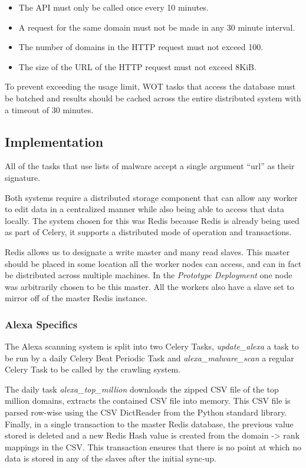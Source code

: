 \begin{itemize}
    \item The API must only be called once every 10 minutes.
    \item A request for the same domain must not be made in any 30 minute interval.
    \item The number of domains in the HTTP request must not exceed 100.
    \item The size of the URL of the HTTP request must not exceed 8KiB.
\end{itemize}

To prevent exceeding the usage limit, WOT tasks that access the database must be batched and results should be cached across the entire distributed system with a timeout of 30 minutes.


\subsection{Implementation}
All of the tasks that use lists of malware accept a single argument ``url'' as their signature.

Both systems require a distributed storage component that can allow any worker to edit data in a centralized manner while also being able to access that data locally. The system chosen for this was Redis\cite{redis} because Redis is already being used as part of Celery, it supports a distributed mode of operation and transactions.

Redis allows us to designate a write master and many read slaves. This master should be placed in some location all the worker nodes can access, and can in fact be distributed across multiple machines.  In the \emph{Prototype Deployment} one node was arbitrarily chosen to be this master. All the workers also have a slave set to mirror off of the master Redis instance.

\subsubsection{Alexa Specifics}
The Alexa scanning system is split into two Celery Tasks, \emph{update\_alexa} a task to be run by a daily Celery Beat Periodic Task and \emph{alexa\_malware\_scan} a regular Celery Task to be called by the crawling system.

The daily task \emph{alexa\_top\_million} downloads the zipped CSV file of the top million domains, extracts the contained CSV file into memory. This CSV file is parsed row-wise using the CSV DictReader from the Python standard library. Finally, in a single transaction to the master Redis database, the previous value stored is deleted and a new Redis Hash value is created from the domain -> rank mappings in the CSV. This transaction ensures that there is no point at which no data is stored in any of the slaves after the initial sync-up.

